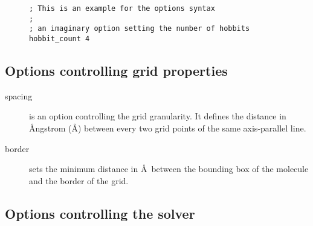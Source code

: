 \documentclass[12pt,twoside,a4paper]{article}
\begin{document}
\begin{figure}[H]
\begin{verbatim}
; This is an example for the options syntax
;
; an imaginary option setting the number of hobbits
hobbit_count 4
\end{verbatim}
\end{figure}

\subsection{Options controlling grid properties}

\begin{description}
\item[spacing] is an option controlling the grid granularity. It defines
	the distance in \AA ngstrom (\AA) between every two grid points of the same
	axis-parallel line.
\item[border] sets the minimum distance in \AA~between the bounding
	box of the molecule and the border of the grid. 
\end{description}

\subsection{Options controlling the solver}
\end{document}
